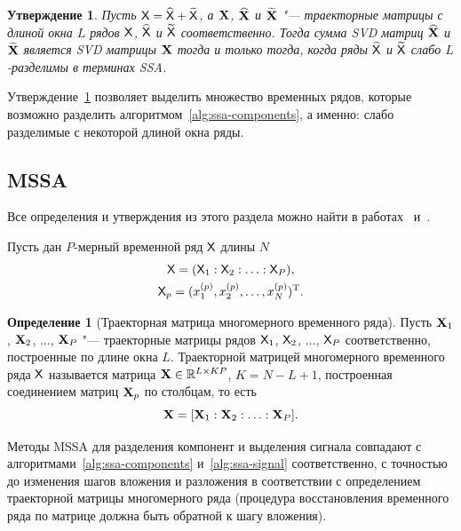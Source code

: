 \documentclass[specialist,
    substylefile = spbu.rtx,
    subf,href,colorlinks=true, 12pt]{disser}
\theoremstyle{plain}
\newtheorem{statement}{Утверждение}[section]
\theoremstyle{definition}
\newtheorem{definition}{Определение}[section]
\theoremstyle{remark}
\begin{document}
    \begin{statement}
        \label{state:ssa-separability}
        Пусть $\mathsf{X} = \widehat{\mathsf{X}} + \widetilde{\mathsf{X}}$, а $\mathbf{X}$, $\widehat{\mathbf{X}}$ и $\widetilde{\mathbf{X}}$ "--- траекторные
        матрицы с длиной окна $L$ рядов $\mathsf{X}$, $\widehat{\mathsf{X}}$ и $\widetilde{\mathsf{X}}$ соответственно.
        Тогда сумма \emph{SVD} матриц $\widehat{\mathbf{X}}$ и $\widetilde{\mathbf{X}}$ является \emph{SVD} матрицы $\mathbf{X}$ тогда и только тогда, когда
        ряды $\widehat{\mathsf{X}}$ и $\widetilde{\mathsf{X}}$ слабо $L$-разделимы в терминах SSA.
    \end{statement}
    
    Утверждение~\ref{state:ssa-separability} позволяет выделить множество временных рядов, которые возможно
    разделить алгоритмом~\ref{alg:ssa-components}, а именно: слабо разделимые с некоторой длиной окна ряды.
    
    
    \subsection{MSSA}\label{subsec:mssa}
    Все определения и утверждения из этого раздела можно найти в работах~\cite{ssa-2020} и~\cite{mssa}.
    
    Пусть дан $P$-мерный временной ряд $\mathsf{X}$ длины $N$
    \begin{gather*}
        \mathsf{X} = (\mathsf{X}_1: \mathsf{X}_2: \ldots: \mathsf{X}_P), \\ 
        \mathsf{X}_p = (x_1^{(p)}, x_2^{(p)}, \ldots, x_N^{(p)})^{\mathrm{T}}.
    \end{gather*}
    
    \begin{definition}[Траекторная матрица многомерного временного ряда]
        Пусть \linebreak $\mathbf{X}_1$, $\mathbf{X}_2$, $\ldots$, $\mathbf{X}_P$ "--- траекторные матрицы рядов 
        $\mathsf{X}_1$, $\mathsf{X}_2$, $\ldots$, $\mathsf{X}_P$ соответственно, построенные по длине окна $L$.
        Траекторной матрицей многомерного временного ряда $\mathsf{X}$ называется
        матрица $\mathbf{X}\in \mathbb{R}^{L \times KP}$, $K = N - L + 1$, построенная соединением матриц $\mathbf{X}_p$ по столбцам, то есть
        \[
            \mathbf{X} = [\mathbf{X}_1 : \mathbf{X}_2 : \ldots : \mathbf{X}_P].
        \]
    \end{definition}

    Методы MSSA для разделения компонент и выделения сигнала совпадают с алгоритмами~\ref{alg:ssa-components}
    и~\ref{alg:ssa-signal} соответственно, с точностью до изменения шагов вложения и разложения в соответствии
    с определением траекторной матрицы многомерного ряда (процедура восстановления временного ряда по
    матрице должна быть обратной к шагу вложения).
    
\end{document}
